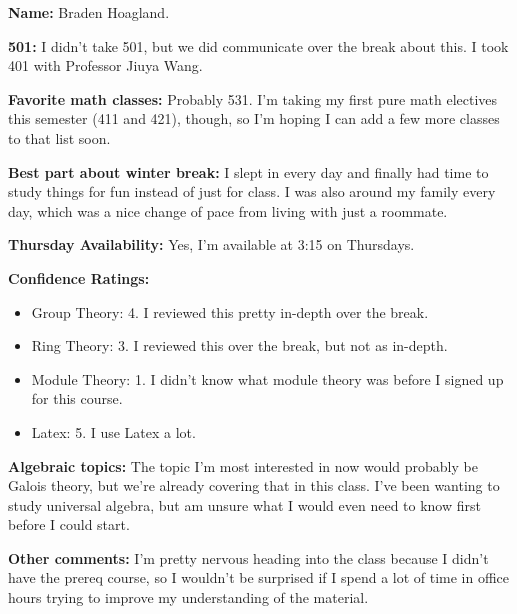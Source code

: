\documentclass[10pt]{report}
\begin{document}

\textbf{Name:} Braden Hoagland.

\textbf{501:} I didn't take 501, but we did communicate over the break about this. I took 401 with Professor Jiuya Wang.

\textbf{Favorite math classes:} Probably 531. I'm taking my first pure math electives this semester (411 and 421), though, so I'm hoping I can add a few more classes to that list soon.

\textbf{Best part about winter break:} I slept in every day and finally had time to study things for fun instead of just for class. I was also around my family every day, which was a nice change of pace from living with just a roommate.

\textbf{Thursday Availability:} Yes, I'm available at 3:15 on Thursdays.

\textbf{Confidence Ratings:}
\begin{itemize}
	\item Group Theory: 4. I reviewed this pretty in-depth over the break.
	\item Ring Theory: 3. I reviewed this over the break, but not as in-depth.
	\item Module Theory: 1. I didn't know what module theory was before I signed up for this course.
	\item Latex: 5. I use Latex a lot.
\end{itemize}

\textbf{Algebraic topics:} The topic I'm most interested in now would probably be Galois theory, but we're already covering that in this class. I've been wanting to study universal algebra, but am unsure what I would even need to know first before I could start.

\textbf{Other comments:} I'm pretty nervous heading into the class because I didn't have the prereq course, so I wouldn't be surprised if I spend a lot of time in office hours trying to improve my understanding of the material.
\end{document}

